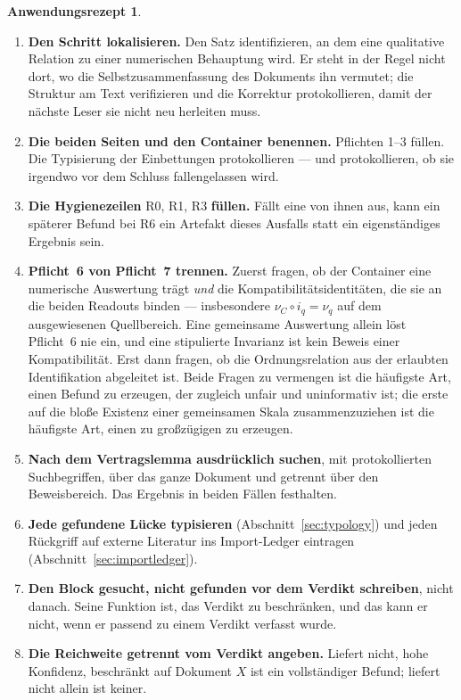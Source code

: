 \documentclass[11pt,a4paper]{article}
\theoremstyle{definition}
\newtheorem*{recipe}{Anwendungsrezept}
\begin{document}
\begin{recipe}
\begin{enumerate}
\item \textbf{Den Schritt lokalisieren.} Den Satz identifizieren, an dem eine
  qualitative Relation zu einer numerischen Behauptung wird. Er steht in der
  Regel nicht dort, wo die Selbstzusammenfassung des Dokuments ihn vermutet; die
  Struktur am Text verifizieren und die Korrektur protokollieren, damit der
  nächste Leser sie nicht neu herleiten muss.
\item \textbf{Die beiden Seiten und den Container benennen.} Pflichten 1--3
  füllen. Die Typisierung der Einbettungen protokollieren --- und protokollieren,
  ob sie irgendwo vor dem Schluss fallengelassen wird.
\item \textbf{Die Hygienezeilen} R0, R1, R3 \textbf{füllen.} Fällt eine von ihnen
  aus, kann ein späterer Befund bei R6 ein Artefakt dieses Ausfalls statt ein
  eigenständiges Ergebnis sein.
\item \textbf{Pflicht~6 von Pflicht~7 trennen.} Zuerst fragen, ob der Container
  eine numerische Auswertung trägt \emph{und} die Kompatibilitätsidentitäten, die
  sie an die beiden Readouts binden --- insbesondere $\nu_C \circ i_q = \nu_q$
  auf dem ausgewiesenen Quellbereich. Eine gemeinsame Auswertung allein löst
  Pflicht~6 nie ein, und eine stipulierte Invarianz ist kein Beweis einer
  Kompatibilität. Erst dann fragen, ob die Ordnungsrelation aus der erlaubten
  Identifikation abgeleitet ist. Beide Fragen zu vermengen ist die häufigste Art,
  einen Befund zu erzeugen, der zugleich unfair und uninformativ ist; die erste
  auf die bloße Existenz einer gemeinsamen Skala zusammenzuziehen ist die
  häufigste Art, einen zu großzügigen zu erzeugen.
\item \textbf{Nach dem Vertragslemma ausdrücklich suchen}, mit protokollierten
  Suchbegriffen, über das ganze Dokument und getrennt über den Beweisbereich. Das
  Ergebnis in beiden Fällen festhalten.
\item \textbf{Jede gefundene Lücke typisieren} (Abschnitt~\ref{sec:typology}) und
  jeden Rückgriff auf externe Literatur ins Import-Ledger eintragen
  (Abschnitt~\ref{sec:importledger}).
\item \textbf{Den Block \glqq gesucht, nicht gefunden\grqq{} vor dem Verdikt schreiben},
  nicht danach. Seine Funktion ist, das Verdikt zu beschränken, und das kann er
  nicht, wenn er passend zu einem Verdikt verfasst wurde.
\item \textbf{Die Reichweite getrennt vom Verdikt angeben.} \glqq Liefert nicht, hohe
  Konfidenz, beschränkt auf Dokument $X$\grqq{} ist ein vollständiger Befund; \glqq liefert
  nicht\grqq{} allein ist keiner.
\end{enumerate}
\end{recipe}
\end{document}
